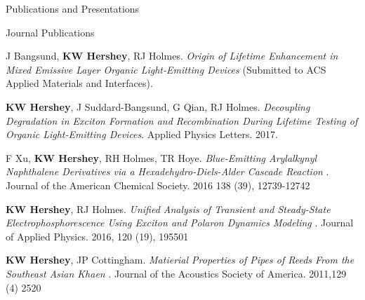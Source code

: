 \documentclass{resume} %
\begin{document}
\begin{rSection}{Publications and Presentations}
\begin{rSubsection}{Journal Publications}{}{}{}
\item J Bangsund, \textbf{KW Hershey}, RJ Holmes. {\em Origin of Lifetime Enhancement in Mixed Emissive Layer Organic Light-Emitting Devices} (Submitted to ACS Applied Materials and Interfaces).
\item  \textbf{KW Hershey}, J Suddard-Bangsund, G Qian, RJ Holmes. {\em Decoupling Degradation in Exciton Formation and Recombination During Lifetime Testing of Organic Light-Emitting Devices}. Applied Physics Letters. 2017.
\item F Xu, \textbf{KW Hershey}, RH Holmes, TR Hoye. {\em Blue-Emitting Arylalkynyl Naphthalene Derivatives via a Hexadehydro-Diels-Alder Cascade Reaction} . Journal of the American Chemical Society. 2016 138 (39), 12739-12742
\item \textbf{KW Hershey}, RJ Holmes. {\em Unified Analysis of Transient and Steady-State Electrophosphorescence Using Exciton and Polaron Dynamics Modeling} . Journal of Applied Physics. 2016, 120 (19), 195501
\item \textbf{KW Hershey}, JP Cottingham. {\em Matierial Properties of Pipes of Reeds From the Southeast Asian Khaen} . Journal of the Acoustics Society of America. 2011,129 (4) 2520

\end{rSubsection}



\end{rSection}
\end{document}
